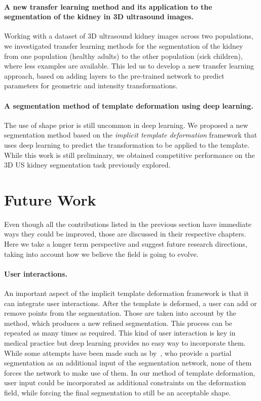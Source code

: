 \paragraph*{A new transfer learning method and its application to the segmentation of the kidney in 3D ultrasound images.}
Working with a dataset of 3D ultrasound kidney images across two populations, we investigated transfer learning methods for the segmentation of the kidney from one population (healthy adults) to the other population (sick children), where less examples are available. This led us to develop a new transfer learning approach, based on adding layers to the pre-trained network to predict parameters for geometric and intensity transformations. 

\paragraph*{A segmentation method of template deformation using deep learning.}
The use of shape prior is still uncommon in deep learning. We proposed a new segmentation method based on the \textit{implicit template deformation} framework that uses deep learning to predict the transformation to be applied to the template. While this work is still preliminary, we obtained competitive performance on the 3D US kidney segmentation task previously explored.

\section{Future Work}

Even though all the contributions listed in the previous section have immediate ways they could be improved, those are discussed in their respective chapters. Here we take a longer term perspective and suggest future research directions, taking into account how we believe the field is going to evolve.

\paragraph*{User interactions.}
An important aspect of the implicit template deformation framework is that it can integrate user interactions. After the template is deformed, a user can add or remove points from the segmentation. Those are taken into account by the method, which produces a new refined segmentation. This process can be repeated as many times as required. This kind of user interaction is key in medical practice but deep learning provides no easy way to incorporate them. While some attempts have been made such as by~\textcite{cicek2016MICCAI}, who provide a partial segmentation as an additional input of the segmentation network, none of them forces the network to make use of them. In our method of template deformation, user input could be incorporated as additional constraints on the deformation field, while forcing the final segmentation to still be an acceptable shape.


